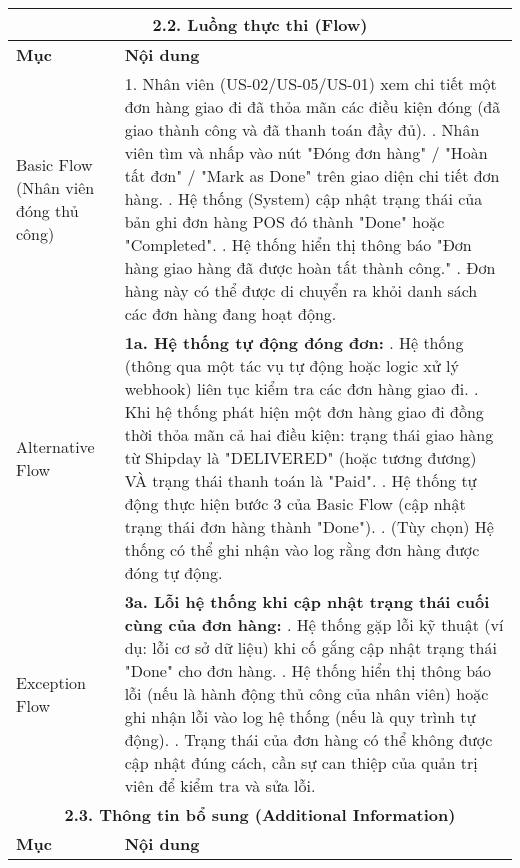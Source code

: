 \begin{longtable}{|m{4cm}|p{11cm}|}
\hline
\multicolumn{2}{|c|}{\textbf{2.2. Luồng thực thi (Flow)}} \\
\hline
\textbf{Mục} & \textbf{Nội dung} \\
\hline
Basic Flow (Nhân viên đóng thủ công) & 1. Nhân viên (US-02/US-05/US-01) xem chi tiết một đơn hàng giao đi đã thỏa mãn các điều kiện đóng (đã giao thành công và đã thanh toán đầy đủ). \newline 2. Nhân viên tìm và nhấp vào nút "Đóng đơn hàng" / "Hoàn tất đơn" / "Mark as Done" trên giao diện chi tiết đơn hàng. \newline 3. Hệ thống (System) cập nhật trạng thái của bản ghi đơn hàng POS đó thành "Done" hoặc "Completed". \newline 4. Hệ thống hiển thị thông báo "Đơn hàng giao hàng đã được hoàn tất thành công." \newline 5. Đơn hàng này có thể được di chuyển ra khỏi danh sách các đơn hàng đang hoạt động. \\
\hline
Alternative Flow & \textbf{1a. Hệ thống tự động đóng đơn:} \newline    1. Hệ thống (thông qua một tác vụ tự động hoặc logic xử lý webhook) liên tục kiểm tra các đơn hàng giao đi. \newline    2. Khi hệ thống phát hiện một đơn hàng giao đi đồng thời thỏa mãn cả hai điều kiện: trạng thái giao hàng từ Shipday là "DELIVERED" (hoặc tương đương) VÀ trạng thái thanh toán là "Paid". \newline    3. Hệ thống tự động thực hiện bước 3 của Basic Flow (cập nhật trạng thái đơn hàng thành "Done"). \newline    4. (Tùy chọn) Hệ thống có thể ghi nhận vào log rằng đơn hàng được đóng tự động. \\
\hline
Exception Flow & \textbf{3a. Lỗi hệ thống khi cập nhật trạng thái cuối cùng của đơn hàng:} \newline    1. Hệ thống gặp lỗi kỹ thuật (ví dụ: lỗi cơ sở dữ liệu) khi cố gắng cập nhật trạng thái "Done" cho đơn hàng. \newline    2. Hệ thống hiển thị thông báo lỗi (nếu là hành động thủ công của nhân viên) hoặc ghi nhận lỗi vào log hệ thống (nếu là quy trình tự động). \newline    3. Trạng thái của đơn hàng có thể không được cập nhật đúng cách, cần sự can thiệp của quản trị viên để kiểm tra và sửa lỗi. \\
\hline
\multicolumn{2}{|c|}{\textbf{2.3. Thông tin bổ sung (Additional Information)}} \\
\hline
\textbf{Mục} & \textbf{Nội dung} \\

\end{longtable}
